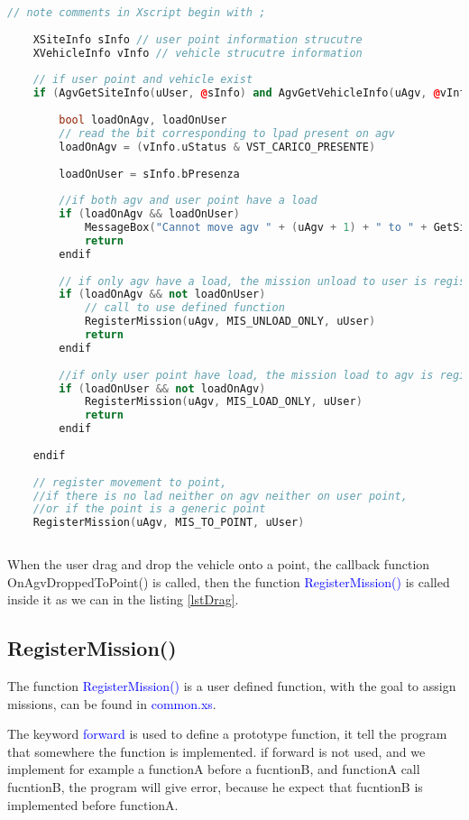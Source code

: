 \begin{lstlisting}[language=c++, caption= Drag and drop to user point and generic point, label=lstDrag]
	// note comments in Xscript begin with ;
	
	XSiteInfo sInfo // user point information strucutre
	XVehicleInfo vInfo // vehicle strucutre information
	
	// if user point and vehicle exist
	if (AgvGetSiteInfo(uUser, @sInfo) and AgvGetVehicleInfo(uAgv, @vInfo))
	
		bool loadOnAgv, loadOnUser
		// read the bit corresponding to lpad present on agv
		loadOnAgv = (vInfo.uStatus & VST_CARICO_PRESENTE)
		
		loadOnUser = sInfo.bPresenza
		
		//if both agv and user point have a load
		if (loadOnAgv && loadOnUser)
			MessageBox("Cannot move agv " + (uAgv + 1) + " to " + GetSiteName(uUser) + " : both have a trolley")
			return
		endif
		
		// if only agv have a load, the mission unload to user is registered
		if (loadOnAgv && not loadOnUser)
			// call to use defined function
			RegisterMission(uAgv, MIS_UNLOAD_ONLY, uUser)
			return
		endif
		
		//if only user point have load, the mission load to agv is registerd.
		if (loadOnUser && not loadOnAgv)
			RegisterMission(uAgv, MIS_LOAD_ONLY, uUser)
			return
		endif
		
	endif
	
	// register movement to point, 
	//if there is no lad neither on agv neither on user point, 
	//or if the point is a generic point
	RegisterMission(uAgv, MIS_TO_POINT, uUser)
	
\end{lstlisting}

When the user drag and drop the vehicle onto a point, the callback function {OnAgvDroppedToPoint()} is called, then the function \textcolor{blue}{RegisterMission()} is called inside it as we can in the listing \ref{lstDrag}.

%
\subsection*{RegisterMission()}
The function \textcolor{blue}{RegisterMission()} is a user defined function, with the goal to assign missions, can be found in \textcolor{blue}{common.xs}.

The keyword \textcolor{blue}{forward} is used to define a prototype function, it tell the program that somewhere the function is implemented. if {forward} is not used, and we implement for example a functionA before a fucntionB, and functionA call fucntionB, the program will give error, because he expect that fucntionB is implemented before functionA.

